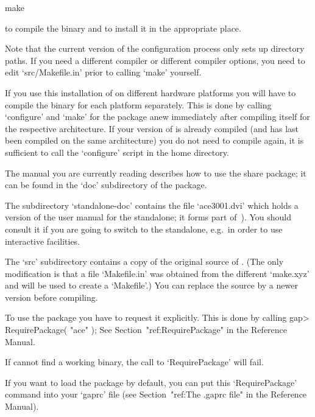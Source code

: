 \begintt
make
\endtt

to compile the binary and to install it in the appropriate place.

Note that the  current version of the configuration  process only sets
up  directory paths.  If you  need a  different compiler  or different
compiler options, you need  to edit `src/Makefile.in' prior to calling
`make' yourself.

If you use this installation of {\GAP} on different hardware platforms
you will have to compile the binary for each platform separately. This
is  done  by calling  `configure'  and  `make'  for the  package  anew
immediately   after  compiling  {\GAP}   itself  for   the  respective
architecture.  If your version of  {\GAP} is already compiled (and has
last  been compiled  on  the same  architecture)  you do  not need  to
compile {\GAP} again, it is  sufficient to call the `configure' script
in the {\GAP} home directory.

The manual you are currently reading describes how to use the   {\ACE}
share package; it can be found in the `doc' subdirectory of the package.

The subdirectory `standalone-doc' contains the file `ace3001.dvi' which
holds a version of the user manual for the {\ACE} standalone; it  forms
part of~\cite{Ram99a}). You should consult it if you are going to switch
to the {\ACE} standalone, e.g.~in order to use interactive facilities.

The  `src' subdirectory  contains a  copy  of the  original source  of
{\ACE}.  (The  only modification  is  that  a  file `Makefile.in'  was
obtained from  the different `make.xyz' and  will be used  to create a
`Makefile'.)  You  can replace  the source by  a newer  version before
compiling.


To use  the {\ACE} package you  have to request it  explicitly. This is
done by calling
\begintt
gap> RequirePackage( "ace" );
\endtt
See Section~"ref:RequirePackage" in the {\GAP} Reference Manual.

If {\GAP} cannot find a working binary, the call to `RequirePackage' will
fail.

If you want to load the {\ACE} package by default, you can put this
`RequirePackage' command into your `gaprc' file
(see Section~"ref:The .gaprc file" in the {\GAP} Reference Manual).


